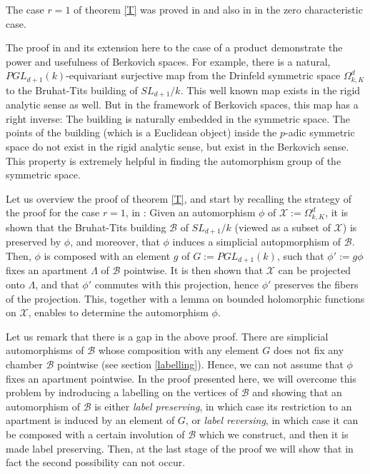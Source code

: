 \documentclass{amsart}
\theoremstyle{theorem}
\theoremstyle{lemma}
\theoremstyle{prop}
\theoremstyle{definition}
\theoremstyle{corollary}
\theoremstyle{remark}
\newcommand{\B}{\mathcal{B}}
\newcommand{\X}{\mathcal{X}}
\begin{document}
The case $r=1$ of theorem \ref{T} was proved in \cite{ber} and also in \cite{ikato} in the zero characteristic case. 

The proof in  \cite{ber} and its extension here to the case of a product demonstrate the power and usefulness of Berkovich spaces. For example, there is a natural,   $PGL_{d+1}(k)$-equivariant surjective map from the Drinfeld symmetric space $\Omega_{k,K}^{d}$ to the Bruhat-Tits building of $SL_{d+1}/k$. This well known map exists in the rigid analytic sense as well. But in the framework of Berkovich spaces, this map has a right inverse: The building is naturally embedded in the symmetric space. The points of the building (which is a Euclidean object) inside the $p$-adic symmetric space do not exist in the rigid analytic sense, but exist in the Berkovich sense. This property is extremely helpful in finding the automorphism group of the symmetric space.

Let us overview the proof of theorem \ref{T}, and start by recalling the strategy of the proof for the case $r=1$, in \cite{ber}: Given an automorphism $\phi$ of $\X:= \Omega_{k,K}^d$, it is shown that the Bruhat-Tits building $\B$ of $SL_{d+1}/k$ (viewed as a subset of $\X$) is preserved by $\phi$, and moreover, that $\phi$ induces a simplicial autopmorphism of $\B$. Then, $\phi$ is composed with an element $g$ of $G:=PGL_{d+1}(k)$, such that $\phi':=g\phi$ fixes an apartment $\Lambda$ of $\B$ pointwise. It is then shown that $\X$ can be projected onto $\Lambda$, and that $\phi'$ commutes with this projection, hence $\phi'$ preserves the fibers of the projection.  This, together with a lemma on bounded holomorphic functions on $\X$, enables to determine the automorphism $\phi$. 

Let us remark that there is a gap in the above proof. There are simplicial automorphisms of $\B$ whose composition with any element $G$ does not fix any chamber $\B$ pointwise (see section \ref{labelling}). Hence, we can not assume that $\phi$ fixes an apartment pointwise. In the proof presented here, we will overcome this problem by indroducing a labelling on the vertices of $\B$ and showing that an automorphism of $\B$ is either \emph{label preserving}, in which case its restriction to an apartment is induced by an element of $G$, or \emph{label reversing}, in which case it can be composed with a certain involution of $\B$ which we construct, and then it is made label preserving. Then, at the last stage of the proof we will show that in fact the second possibility can not occur. 
\end{document}
